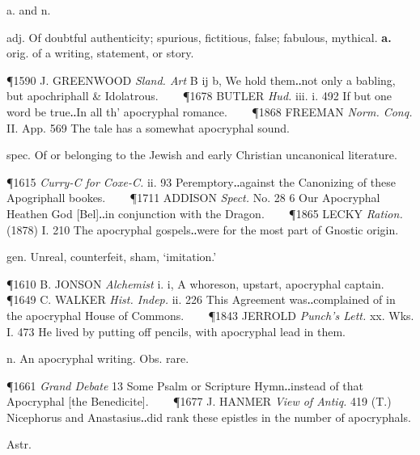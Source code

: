 \begin{description}[wide, labelwidth=!, labelindent=0pt]
 a. and n.

\noindent {}

\noindent [f. as prec. + -al1.]
\vspace{-0.3cm}

\begin{myenumerate}

 adj. Of doubtful authenticity; spurious, fictitious, false;
fabulous, mythical. \textbf{a.} orig. of a writing, statement, or story.

\P 1590 J. GREENWOOD  \textit{Sland. Art} B ij b, We hold them‥not only a babling, but apochriphall \& Idolatrous.    
\P 1678 BUTLER  \textit{Hud.} iii. i. 492 If but one word be true‥In all th' apocryphal romance.    
\P 1868 FREEMAN  \textit{Norm. Conq.} II. App. 569 The tale has a somewhat apocryphal sound.

 spec. Of or belonging to the Jewish and early Christian uncanonical literature.

\P 1615 \textit{Curry-C for Coxe-C.} ii. 93 Peremptory‥against the Canonizing of these Apogriphall bookes.    
\P 1711 ADDISON  \textit{Spect.} No. 28 6 Our Apocryphal Heathen God [Bel]‥in conjunction with the Dragon.    
\P 1865 LECKY  \textit{Ration.} (1878) I. 210 The apocryphal gospels‥were for the most part of Gnostic origin.

 gen. Unreal, counterfeit, sham, ‘imitation.’

\P 1610 B. JONSON  \textit{Alchemist} i. i, A whoreson, upstart, apocryphal captain.    
\P 1649 C. WALKER  \textit{Hist. Indep.} ii. 226 This Agreement was‥complained of in the apocryphal House of Commons.    
\P 1843 JERROLD  \textit{Punch's Lett.} xx. Wks. I. 473 He lived by putting off pencils, with apocryphal lead in them.

 n. An apocryphal writing. Obs. rare.

\P 1661 \textit{Grand  Debate} 13 Some Psalm or Scripture Hymn‥instead of that Apocryphal [the Benedicite].    
\P 1677 J. HANMER  \textit{View of Antiq.} 419 (T.) Nicephorus and Anastasius‥did rank these epistles in the number of apocryphals.
\end{myenumerate}


 Astr.

\noindent {}

\vspace{-0.3cm}


\end{description}
